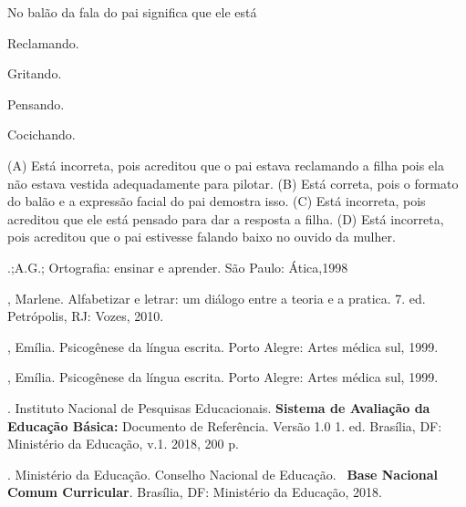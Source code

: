 No balão da fala do pai significa que ele está

\begin{minipage}{.5\textwidth}
\begin{escolha}
\item Reclamando.

\item Gritando.

\item Pensando.

\item Cocichando.
\end{escolha}
\end{minipage}

(A) Está incorreta, pois acreditou que o pai estava reclamando a filha
pois ela não estava vestida adequadamente para pilotar.
(B) Está correta, pois o formato do balão e a expressão facial do pai
demostra isso.
(C) Está incorreta, pois acreditou que ele está pensado para dar a
resposta a filha.
(D) Está incorreta, pois acreditou que o pai estivesse falando baixo no
ouvido da mulher.


\begin{bibliohedra}
.;A.G.; Ortografia: ensinar e aprender. São Paulo: Ática,1998

, Marlene. Alfabetizar e letrar: um diálogo entre a teoria e a
pratica. 7. ed. Petrópolis, RJ: Vozes, 2010.

, Emília. Psicogênese da língua escrita. Porto Alegre: Artes
médica sul, 1999.

, Emília. Psicogênese da língua escrita. Porto Alegre: Artes
médica sul, 1999.

. Instituto Nacional de Pesquisas Educacionais. \textbf{Sistema de
Avaliação da Educação Básica:} Documento de Referência. Versão 1.0 1.
ed. Brasília, DF: Ministério da Educação, v.1. 2018, 200 p.

. Ministério da Educação. Conselho Nacional de Educação.~
\textbf{Base Nacional Comum Curricular}. Brasília, DF: Ministério da
Educação, 2018.
\end{bibliohedra}

